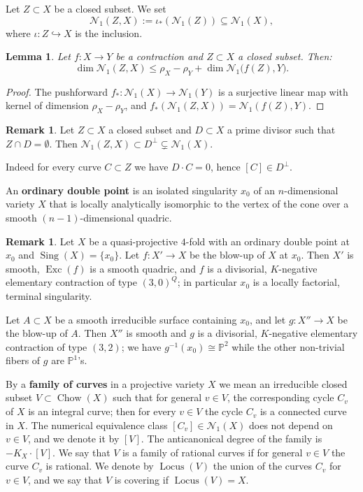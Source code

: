 \documentclass[a4paper,12pt]{amsart}
\newtheorem{lemma}[thm]{Lemma}
\theoremstyle{definition}
\newtheorem{remark}[thm]{Remark}
\numberwithin{figure}{section}
\numberwithin{table}{section}
\newcommand{\pr}{\mathbb{P}}
\newcommand{\N}{\mathcal{N}_1}
\newcommand{\Sing}{\operatorname{Sing}}
\newcommand{\Exc}{\operatorname{Exc}}
\newcommand{\Lo}{\operatorname{Locus}}
\newcommand{\Chow}{\operatorname{Chow}}
\begin{document}
Let $Z\subset X$ be a closed subset. We set
$$\N(Z,X):=\iota_*(\N(Z))\subseteq\N(X),$$
where $\iota\colon Z\hookrightarrow X$ is the inclusion.
\begin{lemma}\label{easy}
Let $f\colon X\to Y$ be a contraction and $Z\subset X$ a closed subset. Then: 
$$\dim\N(Z,X)\leq \rho_X-\rho_Y+\dim\N\bigl(f(Z),Y\bigr).$$
\end{lemma}
\begin{proof}
The pushforward $f_*\colon\N(X)\to\N(Y)$ is a surjective linear map with kernel of dimension $\rho_X-\rho_Y$, and $f_*(\N(Z,X))=\N(f(Z),Y)$.
\end{proof}  
\begin{remark}\label{cassis}
  Let $Z\subset X$ a closed subset and $D\subset X$ a prime divisor such that $Z\cap D=\emptyset$. Then $\N(Z,X)\subset D^{\perp}\subsetneq\N(X)$.

  Indeed for every curve $C\subset Z$ we have $D\cdot C=0$, hence $[C]\in D^{\perp}$.
\end{remark}  
An {\bf ordinary double point}  is an isolated singularity $x_0$ of an $n$-dimensional variety $X$ that is locally analytically isomorphic to the vertex of the cone over a smooth $(n-1)$-dimensional quadric.
\begin{remark}\label{ODP}
  Let $X$ be a quasi-projective $4$-fold with an ordinary double point at $x_0$ and $\Sing(X)=\{x_0\}$. Let $f\colon X'\to X$ be the blow-up of $X$ at $x_0$. Then $X'$ is smooth, $\Exc(f)$ is a smooth quadric, and $f$ is a divisorial, $K$-negative elementary contraction of type $(3,0)^Q$; in particular $x_0$ is a locally factorial, terminal singularity.

  Let $A\subset X$ be a smooth irreducible surface containing $x_0$, and let $g\colon X''\to X$ be the blow-up of $A$. Then $X''$ is smooth and $g$  is a divisorial, $K$-negative elementary contraction of type $(3,2)$; we have $g^{-1}(x_0)\cong\pr^2$ while the other non-trivial fibers of $g$ are $\pr^1$'s.
\end{remark}

By a {\bf family of curves} in a projective variety $X$ we mean an irreducible closed subset $V\subset\Chow(X)$ such that for general $v\in V$, the corresponding cycle $C_v$ of $X$ is an integral curve; then for every $v\in V$ the cycle $C_v$ is a connected curve in $X$.
The numerical equivalence class $[C_v]\in\N(X)$  does not depend on $v\in V$, and we denote it by $[V]$.
The anticanonical degree of the family is $-K_X\cdot [V]$. We say that $V$ is a family of rational curves if for general $v\in V$ the curve $C_v$ is rational. We denote by $\Lo(V)$ the union of the curves $C_v$ for $v\in V$, and we say that $V$ is covering if $\Lo(V)=X$.
\end{document}
